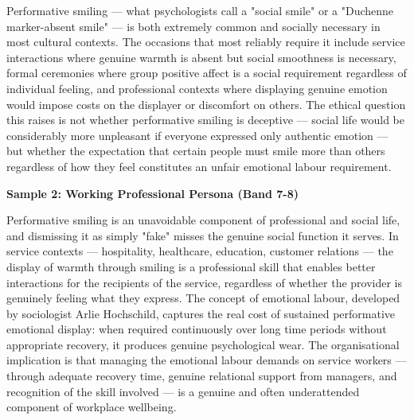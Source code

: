 Performative smiling — what psychologists call a "social smile" or a "Duchenne marker-absent smile" — is both extremely common and socially necessary in most cultural contexts. The occasions that most reliably require it include service interactions where genuine warmth is absent but social smoothness is necessary, formal ceremonies where group positive affect is a social requirement regardless of individual feeling, and professional contexts where displaying genuine emotion would impose costs on the displayer or discomfort on others. The ethical question this raises is not whether performative smiling is deceptive — social life would be considerably more unpleasant if everyone expressed only authentic emotion — but whether the expectation that certain people must smile more than others regardless of how they feel constitutes an unfair emotional labour requirement.

\textbf{Sample 2: Working Professional Persona (Band 7-8)}

Performative smiling is an unavoidable component of professional and social life, and dismissing it as simply "fake" misses the genuine social function it serves. In service contexts — hospitality, healthcare, education, customer relations — the display of warmth through smiling is a professional skill that enables better interactions for the recipients of the service, regardless of whether the provider is genuinely feeling what they express. The concept of emotional labour, developed by sociologist Arlie Hochschild, captures the real cost of sustained performative emotional display: when required continuously over long time periods without appropriate recovery, it produces genuine psychological wear. The organisational implication is that managing the emotional labour demands on service workers — through adequate recovery time, genuine relational support from managers, and recognition of the skill involved — is a genuine and often underattended component of workplace wellbeing.

\separator


